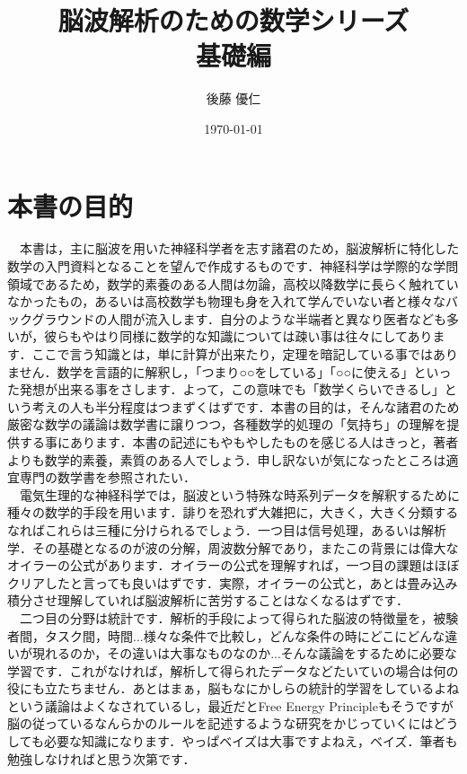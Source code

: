 \documentclass[11pt,a4paper]{jreport}
\title{脳波解析のための数学シリーズ\\
基礎編}
\author{後藤 優仁}
\date{\today}
\begin{document}
\maketitle
%
%
\tableofcontents

\newpage
\section{本書の目的}
　本書は，主に脳波を用いた神経科学者を志す諸君のため，脳波解析に特化した数学の入門資料となることを望んで作成するものです．神経科学は学際的な学問領域であるため，数学的素養のある人間は勿論，高校以降数学に長らく触れていなかったもの，あるいは高校数学も物理も身を入れて学んでいない者と様々なバックグラウンドの人間が流入します．自分のような半端者と異なり医者なども多いが，彼らもやはり同様に数学的な知識については疎い事は往々にしてあります．ここで言う知識とは，単に計算が出来たり，定理を暗記している事ではありません．数学を言語的に解釈し，「つまり○○をしている」「○○に使える」といった発想が出来る事をさします．よって，この意味でも「数学くらいできるし」という考えの人も半分程度はつまずくはずです．本書の目的は，そんな諸君のため厳密な数学の議論は数学書に譲りつつ，各種数学的処理の「気持ち」の理解を提供する事にあります．本書の記述にもやもやしたものを感じる人はきっと，著者よりも数学的素養，素質のある人でしょう．申し訳ないが気になったところは適宜専門の数学書を参照されたい．\\
　電気生理的な神経科学では，脳波という特殊な時系列データを解釈するために種々の数学的手段を用います．誹りを恐れず大雑把に，大きく，大きく分類するなればこれらは三種に分けられるでしょう．一つ目は信号処理，あるいは解析学．その基礎となるのが波の分解，周波数分解であり，またこの背景には偉大なオイラーの公式があります．オイラーの公式を理解すれば，一つ目の課題はほぼクリアしたと言っても良いはずです．実際，オイラーの公式と，あとは畳み込み積分させ理解していれば脳波解析に苦労することはなくなるはずです．\\
　二つ目の分野は統計です．解析的手段によって得られた脳波の特徴量を，被験者間，タスク間，時間...様々な条件で比較し，どんな条件の時にどこにどんな違いが現れるのか，その違いは大事なものなのか...そんな議論をするために必要な学習です．これがなければ，解析して得られたデータなどたいていの場合は何の役にも立たちません．あとはまぁ，脳もなにかしらの統計的学習をしているよねという議論はよくなされているし，最近だとFree Energy Principleもそうですが脳の従っているなんらかのルールを記述するような研究をかじっていくにはどうしても必要な知識になります．やっぱベイズは大事ですよねえ，ベイズ．筆者も勉強しなければと思う次第です．\\
\end{document}
